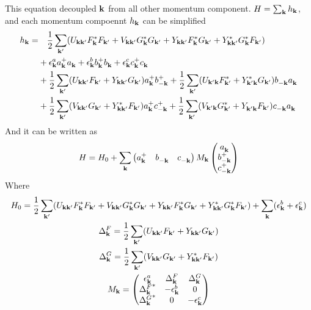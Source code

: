 This equation decoupled $\vk$ from all other momentum component.  $H=\sum_{\vk}h_{\vk}$, and each momentum compoennt $h_{\vk}$ can be simplified 
\begin{equation*}
\begin{split}
 h_{\vk}=&\quad\nth{2}\sum_{\vk'}(U_{\vk\vk'}F_{\vk}^{*}F_{\vk'}+V_{\vk\vk'}G_{\vk}^{*}G_{\vk'}
 +Y_{\vk\vk'}F_{\vk}^{*}G_{\vk'}+Y^*_{\vk\vk'}G_{\vk}^{*}F_{\vk'})\\
 &+\epsilon^a_\vk{}a^+_\vk{}a^{}_\vk+\epsilon^b_\vk{}b^+_\vk{}b^{}_\vk+\epsilon^c_\vk{}c^+_\vk{}c^{}_\vk\\
  &+\nth{2}\sum_{\vk'}(U_{\vk\vk'}F_{\vk'}+Y_{\vk\vk'}G_{\vk'})a^+_\vk{}b^+_{-\vk}{}+\nth{2}\sum_{\vk'}(U_{\vk'\vk}F^{*}_{\vk'}+Y^{*}_{\vk'\vk}G_{\vk'})b^{}_{-\vk}a^{}_{\vk}\\
  &+\nth{2}\sum_{\vk'}(V_{\vk\vk'}G_{\vk'}+Y^{*}_{\vk\vk'}F_{\vk'})a^+_\vk{}c^+_{-\vk}{}+\nth{2}\sum_{\vk'}(V_{\vk'\vk}G^{*}_{\vk'}+Y^{}_{\vk'\vk}F_{\vk'})c^{}_{-\vk}a^{}_{\vk}
    \end{split} 
\end{equation*}
And it can be written as 
\begin{equation}\label{eq:threeLinearized}
H=H_{0}+\sum_{\vk}\begin{pmatrix}a^{+}_{\vk}&b^{}_{-\vk}&c^{}_{-\vk}\end{pmatrix}
M_{\vk}
  \begin{pmatrix}a^{}_{\vk}\\b^{+}_{-\vk}\\c^{+}_{-\vk}\end{pmatrix}
\end{equation}
Where 
\begin{gather}
H_{0}=\nth{2}\sum_{\vk'}(U_{\vk\vk'}F_{\vk}^{*}F_{\vk'}+V_{\vk\vk'}G_{\vk}^{*}G_{\vk'}
 +Y_{\vk\vk'}F_{\vk}^{*}G_{\vk'}+Y^*_{\vk\vk'}G_{\vk}^{*}F_{\vk'})+\sum_{\vk}(\epsilon^{b}_{\vk}+\epsilon^{c}_{\vk})\\
 \Delta^{F}_{\vk}=\nth{2}\sum_{\vk'}(U_{\vk\vk'}F_{\vk'}+Y_{\vk\vk'}G_{\vk'})\\
  \Delta^{G}_{\vk}=\nth{2}\sum_{\vk'}(V_{\vk\vk'}G_{\vk'}+Y^{*}_{\vk\vk'}F_{\vk'})\\
  M_{\vk}=\begin{pmatrix}
  \epsilon^{a}_{\vk}&\Delta^{F}_{\vk}&\Delta^{G}_{\vk}\\
  {\Delta^{F}_{\vk}}^{*}&-\epsilon^{b}_{\vk}&0\\
   {\Delta^{G}_{\vk}}^{*}&0&-\epsilon^{c}_{\vk}\label{eq:canonical:M}\\
  \end{pmatrix}
\end{gather}
